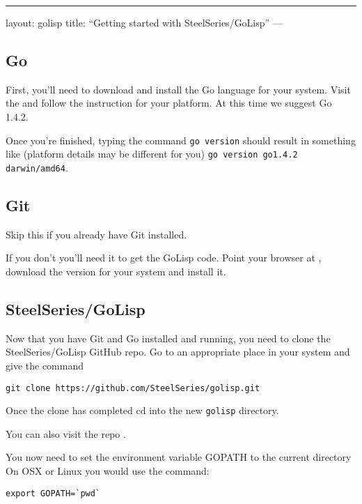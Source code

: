 \documentclass{scrartcl}
\begin{document}
\begin{center}
\rule{3in}{0.4pt}
\end{center}
layout: golisp
title: ``Getting started with SteelSeries/GoLisp''
---

\subsection{Go}\hypertarget{go}{}\label{go}

First, you'll need to download and install the Go language for your system. Visit the  and follow the instruction for your platform. At this time we suggest Go 1.4.2.

Once you're finished, typing the command \texttt{go version} should result in something like (platform details may be different for you) \texttt{go version go1.4.2 darwin/amd64}.

\subsection{Git}\hypertarget{git}{}\label{git}

Skip this if you already have Git installed.

If you don't you'll need it to get the GoLisp code.  Point your browser at , download the version for your system and install it.

\subsection{SteelSeries/GoLisp}\hypertarget{steelseriesgolisp}{}\label{steelseriesgolisp}

Now that you have Git and Go installed and running, you need to clone the SteelSeries/GoLisp GitHub repo. Go to an appropriate place in your system and give the command

\begin{verbatim}git clone https://github.com/SteelSeries/golisp.git
\end{verbatim}

Once the clone has completed cd into the new \texttt{golisp} directory.

You can also visit the repo .

You now need to set the environment variable GOPATH to the current directory On OSX or Linux you would use the command:

\begin{verbatim}export GOPATH=`pwd`
\end{verbatim}
\end{document}
